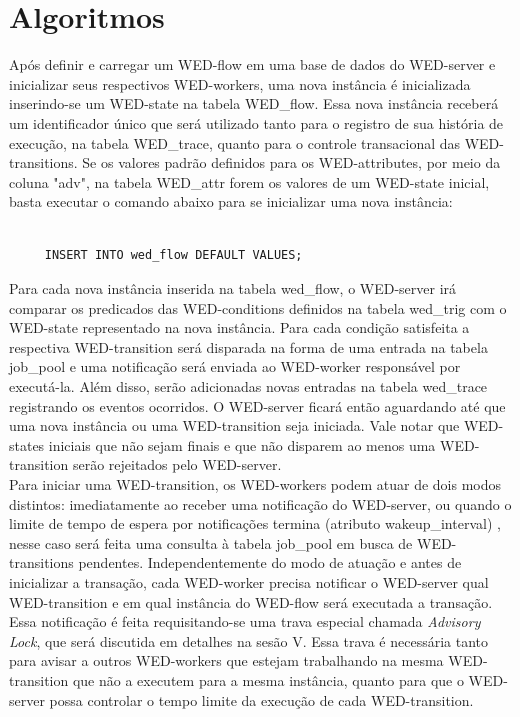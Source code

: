 \documentclass[conference]{IEEEtran}
\begin{document}
\section{Algoritmos}
Após definir e carregar um WED-flow em uma base de dados do WED-server e inicializar seus respectivos WED-workers, uma
nova instância é inicializada inserindo-se um WED-state na tabela WED\_flow. Essa nova instância receberá um identificador
único que será utilizado tanto para o registro de sua história de execução, na tabela WED\_trace, quanto para o controle
transacional das WED-transitions. Se os valores padrão definidos para os WED-attributes, por meio da coluna "adv", na 
tabela WED\_attr forem os valores de um WED-state inicial, basta executar o comando abaixo para se inicializar uma nova
instância:
\begin{Verbatim}[fontsize=\small]

     INSERT INTO wed_flow DEFAULT VALUES;
\end{Verbatim}
  Para cada nova instância inserida na tabela wed\_flow, o WED-server irá comparar os predicados das WED-conditions definidos
na tabela wed\_trig com o WED-state representado na nova instância. Para cada condição satisfeita a respectiva WED-transition
será disparada na forma de uma entrada na tabela job\_pool e uma notificação será enviada ao WED-worker responsável
por executá-la. Além disso, serão adicionadas novas entradas na tabela wed\_trace registrando os eventos ocorridos. O WED-server
ficará então aguardando até que uma nova instância ou uma WED-transition seja iniciada. Vale notar que WED-states iniciais 
que não sejam finais e que não disparem ao menos uma WED-transition serão rejeitados pelo WED-server.
\\
\indent  Para iniciar uma WED-transition, os WED-workers podem atuar de dois modos distintos: imediatamente ao receber 
uma notificação do WED-server, ou quando o limite de tempo de espera por notificações termina (atributo wakeup\_interval) 
, nesse caso será feita uma consulta à tabela job\_pool em busca de WED-transitions pendentes. Independentemente do modo 
de atuação e antes de inicializar a transação, cada WED-worker precisa notificar o WED-server qual WED-transition e em qual 
instância do WED-flow será executada a transação. Essa notificação é feita requisitando-se uma trava especial chamada 
\emph{Advisory Lock}, que será discutida em detalhes na sesão V.
Essa trava é necessária tanto para avisar a outros WED-workers que estejam trabalhando na mesma WED-transition que não a 
executem para a mesma instância, quanto para que o WED-server possa controlar o tempo limite da execução de cada WED-transition. 
\end{document}

